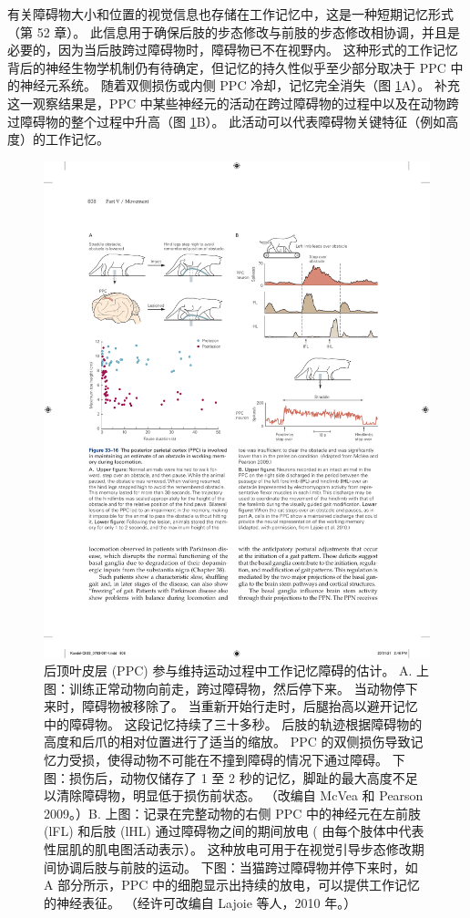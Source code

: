 有关障碍物大小和位置的视觉信息也存储在工作记忆中，这是一种短期记忆形式（第 52 章）。 此信息用于确保后肢的步态修改与前肢的步态修改相协调，并且是必要的，因为当后肢跨过障碍物时，障碍物已不在视野内。 这种形式的工作记忆背后的神经生物学机制仍有待确定，但记忆的持久性似乎至少部分取决于 PPC 中的神经元系统。 
随着双侧损伤或内侧 PPC 冷却，记忆完全消失（图 \ref{fig:33_16}A）。 
补充这一观察结果是，PPC 中某些神经元的活动在跨过障碍物的过程中以及在动物跨过障碍物的整个过程中升高（图 \ref{fig:33_16}B）。 此活动可以代表障碍物关键特征（例如高度）的工作记忆。

\begin{figure}[htbp]
	\centering
	\includegraphics[width=0.95\linewidth]{chap33/fig_33_16}
	\caption{后顶叶皮层 (PPC) 参与维持运动过程中工作记忆障碍的估计。 A. 上图：训练正常动物向前走，跨过障碍物，然后停下来。 当动物停下来时，障碍物被移除了。 当重新开始行走时，后腿抬高以避开记忆中的障碍物。 这段记忆持续了三十多秒。 后肢的轨迹根据障碍物的高度和后爪的相对位置进行了适当的缩放。 PPC 的双侧损伤导致记忆力受损，使得动物不可能在不撞到障碍的情况下通过障碍。 下图：损伤后，动物仅储存了 1 至 2 秒的记忆，脚趾的最大高度不足以清除障碍物，明显低于损伤前状态。 （改编自 McVea 和 Pearson 2009。）B. 上图：记录在完整动物的右侧 PPC 中的神经元在左前肢 (lFL) 和后肢 (lHL) 通过障碍物之间的期间放电 ( 由每个肢体中代表性屈肌的肌电图活动表示）。 这种放电可用于在视觉引导步态修改期间协调后肢与前肢的运动。 下图：当猫跨过障碍物并停下来时，如 A 部分所示，PPC 中的细胞显示出持续的放电，可以提供工作记忆的神经表征。 （经许可改编自 Lajoie 等人，2010 年。）}
	\label{fig:33_16}
\end{figure}


